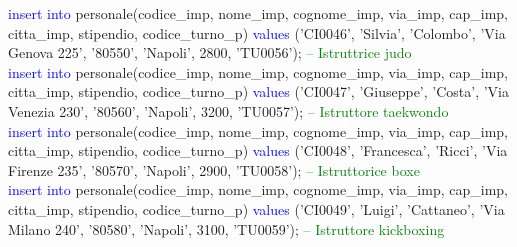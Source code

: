 \documentclass{article}
\begin{document}
\begin{flushleft}
{        \vspace{2mm}
        \hspace*{0.5em}\textcolor{blue}{insert into} personale(codice\_imp, nome\_imp, cognome\_imp, via\_imp, cap\_imp, \hspace*{0.5em}citta\_imp, stipendio, codice\_turno\_p) \textcolor{blue}{values} ('CI0046', 'Silvia', 'Colombo', 'Via \hspace*{0.5em}Genova 225', \hspace*{0.5em}'80550', 'Napoli', 2800, 'TU0056'); \hspace*{0.5em} \textcolor{green}{-- Istruttrice judo} \\
        \vspace{2mm}
        \hspace*{0.5em}\textcolor{blue}{insert into} personale(codice\_imp, nome\_imp, cognome\_imp, via\_imp, cap\_imp, \hspace*{0.5em}citta\_imp, stipendio, codice\_turno\_p) \textcolor{blue}{values} ('CI0047', 'Giuseppe', 'Costa', 'Via \hspace*{0.5em}Venezia 230', \hspace*{0.5em}'80560', 'Napoli', 3200, 'TU0057'); \hspace*{0.5em} \textcolor{green}{-- Istruttore taekwondo} \\
        \newpage
        \hspace*{0.5em}\textcolor{blue}{insert into} personale(codice\_imp, nome\_imp, cognome\_imp, via\_imp, cap\_imp, \hspace*{0.5em}citta\_imp, stipendio, codice\_turno\_p) \textcolor{blue}{values} ('CI0048', 'Francesca', 'Ricci', \hspace*{0.5em}'Via Firenze 235', \hspace*{0.5em}'80570', 'Napoli', 2900, 'TU0058'); \hspace*{0.5em} \textcolor{green}{-- Istruttorice boxe} \\
        \vspace{2mm}
        \hspace*{0.5em}\textcolor{blue}{insert into} personale(codice\_imp, nome\_imp, cognome\_imp, via\_imp, cap\_imp, \hspace*{0.5em}citta\_imp, stipendio, codice\_turno\_p) \textcolor{blue}{values} ('CI0049', 'Luigi', 'Cattaneo', 'Via \hspace*{0.5em}Milano 240', \hspace*{0.5em}'80580', 'Napoli', 3100, 'TU0059'); \hspace*{0.5em} \textcolor{green}{-- Istruttore kickboxing} \\
}
\end{flushleft}
\end{document}
